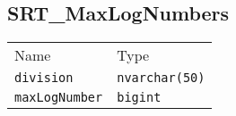\subsection{SRT\_MaxLogNumbers}
\begin{table}[h]
\centering
\begin{tabular}{ll}
Name    & Type  \\
\verb|division|     &   \verb|nvarchar(50)| \\
\verb|maxLogNumber| &   \verb|bigint|
\end{tabular}
\end{table}
